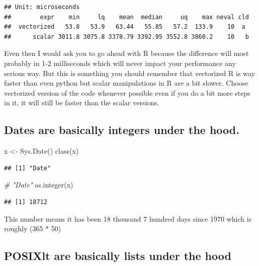 \documentclass[
]{book}
\newenvironment{Shaded}{\begin{snugshade}}{\end{snugshade}}
\newcommand{\CommentTok}[1]{\textcolor[rgb]{0.56,0.35,0.01}{\textit{#1}}}
\newcommand{\FunctionTok}[1]{\textcolor[rgb]{0.00,0.00,0.00}{#1}}
\newcommand{\NormalTok}[1]{#1}
\newcommand{\OtherTok}[1]{\textcolor[rgb]{0.56,0.35,0.01}{#1}}
\begin{document}
\begin{verbatim}
## Unit: microseconds
##        expr    min     lq    mean  median     uq    max neval cld
##  vectorized   53.8   53.9   63.44   55.85   57.2  133.9    10  a 
##      scalar 3011.8 3075.8 3378.79 3392.95 3552.8 3860.2    10   b
\end{verbatim}

Even then I would ask you to go ahead with R because the difference will most probably in 1-2 milliseconds which will never impact your performance any serious way. But this is something you should remember that vectorized R is way faster than even python but scalar manipulations in R are a bit slower. Choose vectorized version of the code whenever possible even if you do a bit more steps in it, it will still be faster than the scalar versions.

\hypertarget{dates-are-basically-integers-under-the-hood.}{%
\subsection{Dates are basically integers under the hood.}\label{dates-are-basically-integers-under-the-hood.}}

\begin{Shaded}
\begin{Highlighting}[]
\NormalTok{x }\OtherTok{\textless{}{-}} \FunctionTok{Sys.Date}\NormalTok{()}
\FunctionTok{class}\NormalTok{(x)}
\end{Highlighting}
\end{Shaded}

\begin{verbatim}
## [1] "Date"
\end{verbatim}

\begin{Shaded}
\begin{Highlighting}[]
\CommentTok{\# "Date"}
\FunctionTok{as.integer}\NormalTok{(x)}
\end{Highlighting}
\end{Shaded}

\begin{verbatim}
## [1] 18712
\end{verbatim}

This number means it has been 18 thousand 7 hundred days since 1970 which is roughly (365 * 50)

\hypertarget{posixlt-are-basically-lists-under-the-hood}{%
\subsection{POSIXlt are basically lists under the hood}\label{posixlt-are-basically-lists-under-the-hood}}
\end{document}
